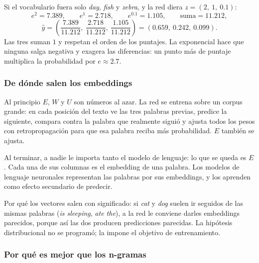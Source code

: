 \documentclass[11pt,letterpaper]{article}
\begin{document}
\begin{ejemplo}
    Si el vocabulario fuera solo \textit{day}, \textit{fish} y
    \textit{zebra}, y la red diera $z = (2,\ 1,\ 0.1)$:
    \[
        e^{2} = 7.389 , \qquad e^{1} = 2.718 , \qquad
        e^{0.1} = 1.105 , \qquad \text{suma} = 11.212 ,
    \]
    \[
        \hat{y} = \left(\frac{7.389}{11.212},\ \frac{2.718}{11.212},\
                  \frac{1.105}{11.212}\right)
                = (0.659,\ 0.242,\ 0.099) .
    \]
    Las tres suman $1$ y respetan el orden de los puntajes. La
    exponencial hace que ninguna salga negativa y exagera las
    diferencias: un punto más de puntaje multiplica la probabilidad por
    $e \approx 2.7$.
\end{ejemplo}

\subsubsection*{De dónde salen los embeddings}

Al principio $E$, $W$ y $U$ son números al azar. La red se entrena
sobre un corpus grande: en cada posición del texto ve las tres
palabras previas, predice la siguiente, compara contra la palabra que
realmente siguió y ajusta todos los pesos con retropropagación para
que esa palabra reciba más probabilidad. $E$ también se ajusta.

Al terminar, a nadie le importa tanto el modelo de lenguaje: lo que se
queda es $E$. Cada una de sus columnas es el embedding de una palabra.
Los modelos de lenguaje neuronales representan las palabras por sus
embeddings, y los aprenden como efecto secundario de predecir.

\begin{idea}
    Por qué los vectores salen con significado: si \textit{cat} y
    \textit{dog} suelen ir seguidos de las mismas palabras
    (\textit{is sleeping}, \textit{ate the}), a la red le conviene darles
    embeddings parecidos, porque así las dos producen predicciones
    parecidas. La hipótesis distribucional no se programó; la impone el
    objetivo de entrenamiento.
\end{idea}

\subsubsection*{Por qué es mejor que los n-gramas}
\end{document}
